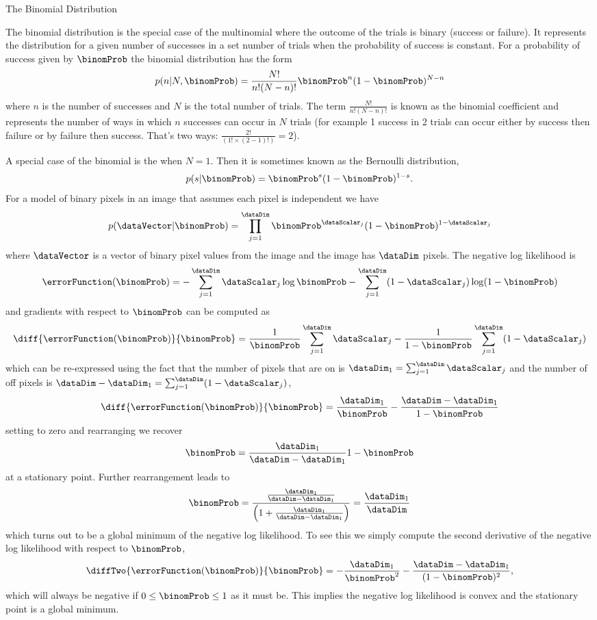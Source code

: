 \begin{boxfloat}
  \caption{The Binomial Distribution}\label{box:binomial}

  \boxfontsize
  The binomial distribution is the special case of the multinomial where
  the outcome of the trials is binary (success or failure). It
  represents the distribution for a given number of successes in a set
  number of trials when the probability of success is constant. For a
  probability of success given by $\binomProb$ the binomial distribution
  has the form
  \[
  p(n|N, \binomProb)=\frac{N!}{n!(N-n)!}  \binomProb^n (1-\binomProb)^{N-n}
  \]
  where $n$ is the number of successes and $N$ is the total number of
  trials. The term $\frac{N!}{n!(N-n)!}$ is known as the binomial
  coefficient and represents the number of ways in which $n$ successes
  can occur in $N$ trials (for example 1 success in 2 trials can occur
  either by success then failure or by failure then success. That's two
  ways: $\frac{2!}{(1!\times (2-1)!)} = 2$).

  A special case of the binomial is the when $N=1$. Then it is sometimes
  known as the Bernoulli distribution,
  \[
  p(s|\binomProb) = \binomProb^s (1-\binomProb)^{1-s}.
  \]
  For a model of binary pixels in an image that assumes each pixel is
  independent we have
  \[
  p(\dataVector|\binomProb) = \prod_{j=1}^{\dataDim}
  \binomProb^{\dataScalar_j} (1-\binomProb)^{1-\dataScalar_j}
  \]
  where $\dataVector$ is a vector of binary pixel values from the image
  and the image has $\dataDim$ pixels. The negative log likelihood is
  \[
  \errorFunction(\binomProb) = -\sum_{j=1}^\dataDim\dataScalar_j \log \binomProb -
  \sum_{j=1}^{\dataDim}(1-\dataScalar_j) \log(1-\binomProb)
  \]
  and gradients with respect to $\binomProb$ can be computed as
  \[
  \diff{\errorFunction(\binomProb)}{\binomProb} =
  \frac{1}{\binomProb}\sum_{j=1}^\dataDim \dataScalar_j -
  \frac{1}{1-\binomProb}\sum_{j=1}^\dataDim (1-\dataScalar_j)
  \]
  which can be re-expressed using the fact that the number of pixels
  that are on is $\dataDim_1=\sum_{j=1}^\dataDim\dataScalar_j$ and the
  number of off pixels is $\dataDim -\dataDim_1 = \sum_{j=1}^\dataDim
  (1-\dataScalar_j)$,
  \[
  \diff{\errorFunction(\binomProb)}{\binomProb} = \frac{\dataDim_1}{\binomProb} -
  \frac{\dataDim-\dataDim_1}{1-\binomProb}
  \]
  setting to zero and rearranging we recover
  \[
  \binomProb = \frac{\dataDim_1}{\dataDim-\dataDim_1}{1-\binomProb}
  \]
  at a stationary point. Further rearrangement leads to
  \[
  \binomProb =\frac{\frac{\dataDim_1}{\dataDim-\dataDim_1}}{\left(1 +
      \frac{\dataDim_1}{\dataDim-\dataDim_1}\right)} =
  \frac{\dataDim_1}{\dataDim}
  \]
  which turns out to be a global minimum of the negative log
  likelihood. To see this we simply compute the second derivative of the
  negative log likelihood with respect to $\binomProb$,
  \[
  \diffTwo{\errorFunction(\binomProb)}{\binomProb} = -
  \frac{\dataDim_1}{\binomProb^2} -
  \frac{\dataDim-\dataDim_1}{(1-\binomProb)^2},
  \]
  which will always be negative if $0 \leq \binomProb \leq 1$ as it must
  be. This implies the negative log likelihood is convex and the
  stationary point is a global minimum.
\end{boxfloat}
